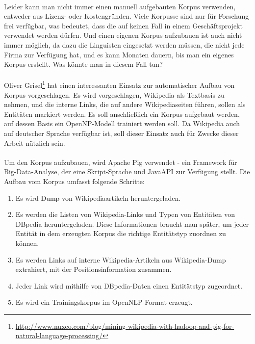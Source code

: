 \paragraph{}
Leider kann man nicht immer einen manuell aufgebauten Korpus verwenden, entweder aus Lizenz- oder Kostengründen. Viele Korpusse sind nur für Forschung frei verfügbar, was bedeutet, dass 
die auf keinen Fall in einem Geschäftsprojekt verwendet werden dürfen. Und einen eigenen Korpus aufzubauen ist auch nicht immer möglich, da dazu die Linguisten eingesetzt werden müssen, die nicht jede Firma zur Verfügung hat, und es kann Monaten dauern, bis man ein eigenes Korpus erstellt. Was könnte man in diesem Fall tun?

\paragraph{}
Oliver Grisel\footnote{\url{http://www.nuxeo.com/blog/mining-wikipedia-with-hadoop-and-pig-for-natural-language-processing/}} hat einen interessanten Einsatz zur automatischer Aufbau von Korpus vorgeschlagen. Es wird vorgeschlagen, Wikipedia als Textbasis zu nehmen, und die interne Links, die auf andere Wikipediaseiten führen, sollen als  Entitäten markiert werden. Es soll anschließlich ein Korpus aufgebaut werden, auf dessen Basis ein OpenNP-Modell trainiert werden soll. Da Wikipedia auch auf deutscher Sprache verfügbar ist, soll dieser Einsatz auch für Zwecke dieser Arbeit nützlich sein.

\paragraph{}
Um den Korpus aufzubauen, wird Apache Pig verwendet - ein Framework für Big-Data-Analyse, der eine Skript-Sprache und JavaAPI zur Verfügung stellt. Die Aufbau vom Korpus umfasst folgende Schritte:
\begin{enumerate}
\item Es wird Dump von Wikipediaartikeln heruntergeladen.
\item Es werden die Listen von Wikipedia-Links und Typen von Entitäten von DBpedia heruntergeladen. Diese Informationen braucht man später, um jeder Entität in dem erzeugten Korpus die richtige Entitätstyp zuordnen zu können.
\item Es werden Links auf interne Wikipedia-Artikeln aus Wikipedia-Dump extrahiert, mit der Positionsinformation zusammen.
\item Jeder Link wird mithilfe von DBpedia-Daten einen Entitätstyp zugeordnet.
\item Es wird ein Trainingskorpus im OpenNLP-Format erzeugt.
\end{enumerate}

